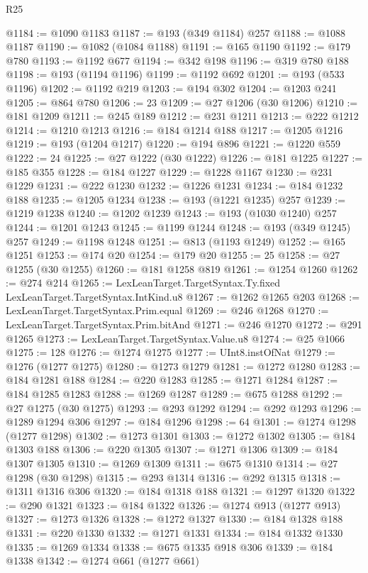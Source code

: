 \begin{lexlean}{R25}
\begin{coremodule}
@1184 := @1090 @1183
@1187 := @193 (@349 @1184) @257
@1188 := @1088 @1187
@1190 := @1082 (@1084 @1188)
@1191 := @165 @1190
@1192 := @179 @780
@1193 := @1192 @677
@1194 := @342 @198
@1196 := @319 @780 @188
@1198 := @193 (@1194 @1196)
@1199 := @1192 @692
@1201 := @193 (@533 @1196)
@1202 := @1192 @219
@1203 := @194 @302
@1204 := @1203 @241
@1205 := @864 @780
@1206 := 23
@1209 := @27 @1206 (@30 @1206)
@1210 := @181 @1209
@1211 := @245 @189
@1212 := @231 @1211
@1213 := @222 @1212
@1214 := @1210 @1213
@1216 := @184 @1214 @188
@1217 := @1205 @1216
@1219 := @193 (@1204 @1217)
@1220 := @194 @896
@1221 := @1220 @559
@1222 := 24
@1225 := @27 @1222 (@30 @1222)
@1226 := @181 @1225
@1227 := @185 @355
@1228 := @184 @1227
@1229 := @1228 @1167
@1230 := @231 @1229
@1231 := @222 @1230
@1232 := @1226 @1231
@1234 := @184 @1232 @188
@1235 := @1205 @1234
@1238 := @193 (@1221 @1235) @257
@1239 := @1219 @1238
@1240 := @1202 @1239
@1243 := @193 (@1030 @1240) @257
@1244 := @1201 @1243
@1245 := @1199 @1244
@1248 := @193 (@349 @1245) @257
@1249 := @1198 @1248
@1251 := @813 (@1193 @1249)
@1252 := @165 @1251
@1253 := @174 @20
@1254 := @179 @20
@1255 := 25
@1258 := @27 @1255 (@30 @1255)
@1260 := @181 @1258 @819
@1261 := @1254 @1260
@1262 := @274 @214
@1265 := LexLeanTarget.TargetSyntax.Ty.fixed LexLeanTarget.TargetSyntax.IntKind.u8
@1267 := @1262 @1265 @203
@1268 := LexLeanTarget.TargetSyntax.Prim.equal
@1269 := @246 @1268
@1270 := LexLeanTarget.TargetSyntax.Prim.bitAnd
@1271 := @246 @1270
@1272 := @291 @1265
@1273 := LexLeanTarget.TargetSyntax.Value.u8
@1274 := @25 @1066
@1275 := 128
@1276 := @1274 @1275
@1277 := UInt8.instOfNat
@1279 := @1276 (@1277 @1275)
@1280 := @1273 @1279
@1281 := @1272 @1280
@1283 := @184 @1281 @188
@1284 := @220 @1283
@1285 := @1271 @1284
@1287 := @184 @1285 @1283
@1288 := @1269 @1287
@1289 := @675 @1288
@1292 := @27 @1275 (@30 @1275)
@1293 := @293 @1292
@1294 := @292 @1293
@1296 := @1289 @1294 @306
@1297 := @184 @1296
@1298 := 64
@1301 := @1274 @1298 (@1277 @1298)
@1302 := @1273 @1301
@1303 := @1272 @1302
@1305 := @184 @1303 @188
@1306 := @220 @1305
@1307 := @1271 @1306
@1309 := @184 @1307 @1305
@1310 := @1269 @1309
@1311 := @675 @1310
@1314 := @27 @1298 (@30 @1298)
@1315 := @293 @1314
@1316 := @292 @1315
@1318 := @1311 @1316 @306
@1320 := @184 @1318 @188
@1321 := @1297 @1320
@1322 := @290 @1321
@1323 := @184 @1322
@1326 := @1274 @913 (@1277 @913)
@1327 := @1273 @1326
@1328 := @1272 @1327
@1330 := @184 @1328 @188
@1331 := @220 @1330
@1332 := @1271 @1331
@1334 := @184 @1332 @1330
@1335 := @1269 @1334
@1338 := @675 @1335 @918 @306
@1339 := @184 @1338
@1342 := @1274 @661 (@1277 @661)

\end{coremodule}
\end{lexlean}
